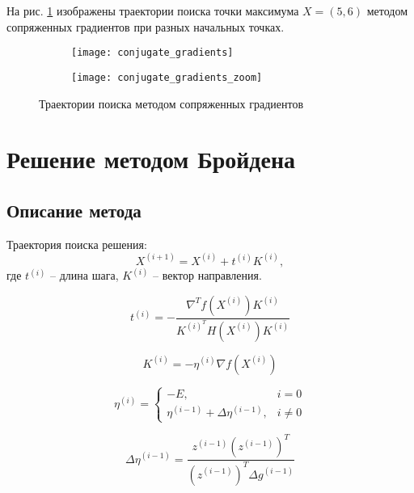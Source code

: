 \vspace{-0.5cm}

На рис. \ref{fig:conjugate_gradient} изображены траектории поиска точки максимума $X = (5, 6)$ методом сопряженных градиентов при разных начальных точках.
\begin{figure}[H]
\begin{center}
	\begin{subfigure}[b]{0.49\textwidth}
		\texttt{[image: conjugate\_gradients]}
	\end{subfigure}
	\begin{subfigure}[b]{0.49\textwidth}
		\texttt{[image: conjugate\_gradients\_zoom]}
	\end{subfigure}
	\caption{Траектории поиска методом сопряженных градиентов}
	\label{fig:conjugate_gradient}
\end{center}
\end{figure}

\section{Решение методом Бройдена}

\subsection{Описание метода}

Траектория поиска решения:
\begin{equation*}
X^{(i+1)}  = X^{(i)} + t^{(i)} K^{(i)},
\end{equation*}
где $t^{(i)}$ -- длина шага, $K^{(i)}$ -- вектор направления.

\begin{equation*}
t^{(i)} = -\dfrac{\nabla^T f\left(X^{(i)}\right) K^{(i)}}{K^{(i)^T} H\left(X^{(i)}\right) K^{(i)}}
\end{equation*}

\begin{equation*}
K^{(i)} = -\eta^{(i)} \nabla f\left(X^{(i)}\right)
\end{equation*}

\begin{equation*}
\eta^{(i)} = 
\begin{cases}
-E, &i = 0\\
\eta^{(i-1)} + \Delta \eta^{(i-1)}, &i \neq 0
\end{cases}
\end{equation*}

\begin{equation*}
\Delta \eta^{(i-1)} = \dfrac{z^{(i-1)} \left(z^{(i-1)}\right)^T}{\left(z^{(i-1)}\right)^T \Delta g^{(i-1)}}
\end{equation*}

